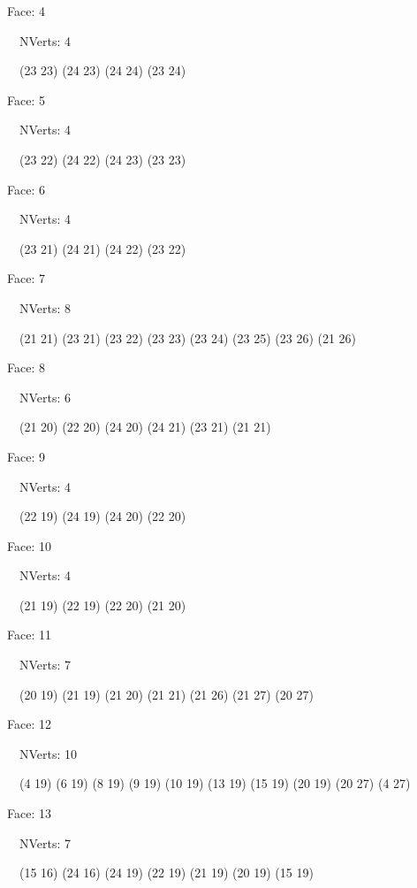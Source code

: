 \documentclass{article}
\begin{document}
{\footnotesize 

Face: 4

\   \    NVerts: 4

 \   \   (23 23) (24 23) (24 24) (23 24)}

{\footnotesize 

Face: 5

\   \    NVerts: 4

 \   \   (23 22) (24 22) (24 23) (23 23)}

{\footnotesize 

Face: 6

\   \    NVerts: 4

 \   \   (23 21) (24 21) (24 22) (23 22)}

{\footnotesize 

Face: 7

\   \    NVerts: 8

 \   \   (21 21) (23 21) (23 22) (23 23) (23 24) (23 25) (23 26) (21 26)}

{\footnotesize 

Face: 8

\   \    NVerts: 6

 \   \   (21 20) (22 20) (24 20) (24 21) (23 21) (21 21)}

{\footnotesize 

Face: 9

\   \    NVerts: 4

 \   \   (22 19) (24 19) (24 20) (22 20)}

{\footnotesize 

Face: 10

\   \    NVerts: 4

 \   \   (21 19) (22 19) (22 20) (21 20)}

{\footnotesize 

Face: 11

\   \    NVerts: 7

 \   \   (20 19) (21 19) (21 20) (21 21) (21 26) (21 27) (20 27)}

{\footnotesize 

Face: 12

\   \    NVerts: 10

 \   \   (4 19) (6 19) (8 19) (9 19) (10 19) (13 19) (15 19) (20 19) (20 27) (4 27)}

{\footnotesize 

Face: 13

\   \    NVerts: 7

 \   \   (15 16) (24 16) (24 19) (22 19) (21 19) (20 19) (15 19)}
\end{document}
